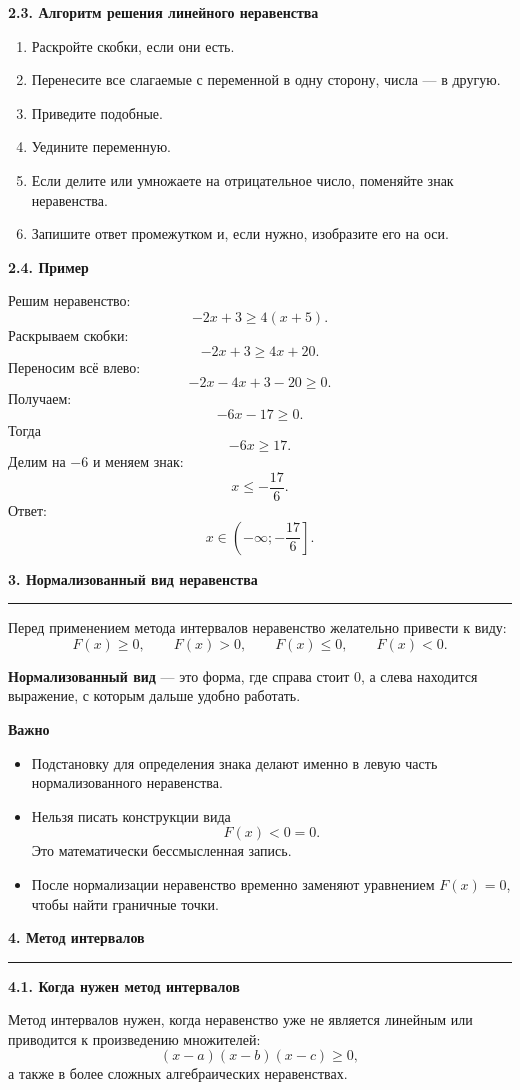 \documentclass[a4paper,12pt]{article}
\newcommand{\sectiontitle}[1]{%
  \vspace{0.6em}
  {\Large\bfseries\textcolor{darkaccent}{#1}}\par
  \vspace{0.25em}
  {\color{accent}\rule{\linewidth}{0.5pt}}
  \vspace{0.4em}
}
\newcommand{\subsectiontitle}[1]{%
  \vspace{0.5em}
  {\large\bfseries\textcolor{darkaccent}{#1}}\par
  \vspace{0.15em}
}
\newcommand{\important}[1]{\textbf{\textcolor{darkaccent}{#1}}}
\begin{document}
\subsectiontitle{2.3. Алгоритм решения линейного неравенства}

\begin{enumerate}
  \item Раскройте скобки, если они есть.
  \item Перенесите все слагаемые с переменной в одну сторону, числа — в другую.
  \item Приведите подобные.
  \item Уедините переменную.
  \item Если делите или умножаете на отрицательное число, поменяйте знак неравенства.
  \item Запишите ответ промежутком и, если нужно, изобразите его на оси.
\end{enumerate}

\subsectiontitle{2.4. Пример}

Решим неравенство:
\[
-2x+3\ge 4(x+5).
\]
Раскрываем скобки:
\[
-2x+3\ge 4x+20.
\]
Переносим всё влево:
\[
-2x-4x+3-20\ge 0.
\]
Получаем:
\[
-6x-17\ge 0.
\]
Тогда
\[
-6x\ge 17.
\]
Делим на $-6$ и меняем знак:
\[
x\le -\frac{17}{6}.
\]
Ответ:
\[
x\in\left(-\infty;-\frac{17}{6}\right].
\]

\sectiontitle{3. Нормализованный вид неравенства}

Перед применением метода интервалов неравенство желательно привести к виду:
\[
F(x)\ge 0,\qquad F(x)>0,\qquad F(x)\le 0,\qquad F(x)<0.
\]

\important{Нормализованный вид} — это форма, где справа стоит $0$, а слева находится выражение, с которым дальше удобно работать.

\subsectiontitle{Важно}

\begin{itemize}
  \item Подстановку для определения знака делают именно в левую часть нормализованного неравенства.
  \item Нельзя писать конструкции вида
  \[
  F(x)<0=0.
  \]
  Это математически бессмысленная запись.
  \item После нормализации неравенство временно заменяют уравнением $F(x)=0$, чтобы найти граничные точки.
\end{itemize}

\sectiontitle{4. Метод интервалов}

\subsectiontitle{4.1. Когда нужен метод интервалов}

Метод интервалов нужен, когда неравенство уже не является линейным или приводится к произведению множителей:
\[
(x-a)(x-b)(x-c)\ge 0,
\]
а также в более сложных алгебраических неравенствах.
\end{document}
